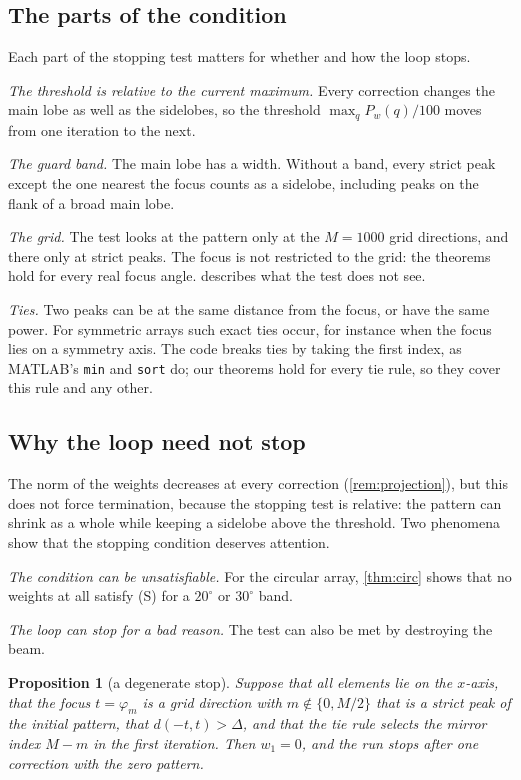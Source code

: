 \documentclass[11pt]{amsart}
\theoremstyle{plain}
\newtheorem{proposition}[lemma]{Proposition}
\theoremstyle{definition}
\newcommand{\dist}{d}
\begin{document}
\subsection{The parts of the condition}

Each part of the stopping test matters for whether and how the loop stops.

\emph{The threshold is relative to the current maximum.}  Every correction changes the main lobe as
well as the sidelobes, so the threshold $\max_q P_w(q)/100$ moves from one iteration to the next.

\emph{The guard band.}  The main lobe has a width.  Without a band, every strict peak except the one
nearest the focus counts as a sidelobe, including peaks on the flank of a broad main lobe.

\emph{The grid.}  The test looks at the pattern only at the $M = 1000$ grid directions, and there only
at strict peaks.  The focus is not restricted to the grid: the theorems hold for every real focus
angle.   describes what the test does not see.

\emph{Ties.}  Two peaks can be at the same distance from the focus, or have the same power.  For
symmetric arrays such exact ties occur, for instance when the focus lies on a symmetry axis.  The
code breaks ties by taking the first index, as MATLAB's \texttt{min} and \texttt{sort} do; our
theorems hold for every tie rule, so they cover this rule and any other.

\subsection{Why the loop need not stop}

The norm of the weights decreases at every correction (\cref{rem:projection}), but this does not
force termination, because the stopping test is relative: the pattern can shrink as a whole while
keeping a sidelobe above the threshold.  Two phenomena show that the stopping condition deserves
attention.

\emph{The condition can be unsatisfiable.}  For the circular array, \cref{thm:circ} shows that no
weights at all satisfy (S) for a $20^\circ$ or $30^\circ$ band.

\emph{The loop can stop for a bad reason.}  The test can also be met by destroying the beam.

\begin{proposition}[a degenerate stop]\label{prop:collinear}
Suppose that all elements lie on the $x$-axis, that the focus $t = \varphi_m$ is a grid direction
with $m \notin \{0, M/2\}$ that is a strict peak of the initial pattern, that $\dist(-t, t) > \Delta$,
and that the tie rule selects the mirror index $M - m$ in the first iteration.  Then
$w_1 = 0$, and the run stops after one correction with the zero pattern.
\end{proposition}
\end{document}
